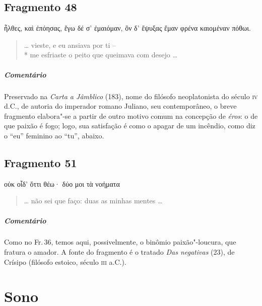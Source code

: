\section{Fragmento 48}

\begin{gkverse}
ἦλθες, \dagger{}καὶ\dagger{} ἐπόησας, ἔγω δέ σ’ ἐμαιόμαν,
ὂν δ’ ἔψυξας ἔμαν φρένα καιομέναν πόθωι.
\end{gkverse}

\begin{verse}
\ldots{} vieste, e eu ansiava por ti -- \\*
me esfriaste o peito que queimava com desejo \ldots{}
\end{verse}

{\paragraph{Comentário} Preservado na \textit{Carta a Jâmblico} (183), nome do filósofo neoplatonista do
século \textsc{iv} d.C., de autoria do imperador romano Juliano, seu contemporâneo, o
breve fragmento elabora"-se a partir de outro motivo comum na concepção de
\textit{éros}: o de que paixão é fogo; logo, sua satisfação é como o apagar de
um incêndio, como diz o “eu” feminino ao “tu”, abaixo.}

\section{Fragmento 51}

\begin{gkverse}
οὐκ οἶδ’ ὄττι θέω· δύο μοι τὰ νοήματα
\end{gkverse}

\begin{verse}
\ldots{} não sei que faço: duas as minhas mentes \ldots{}
\end{verse}

{\paragraph{Comentário} Como no Fr.\,36, temos aqui, possivelmente, o binômio paixão"-loucura, que fratura o amador. A
fonte do fragmento é o tratado \textit{Das negativas} (23), de Crísipo (filósofo
estoico, século \textsc{iii} a.C.).}   


\chapter{Sono}


